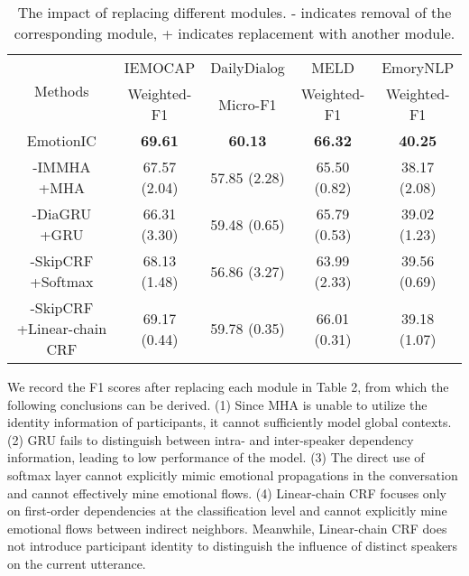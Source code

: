 \documentclass{SCIS2019}
\begin{document}
\begin{table}[htbp]
	\centering	
	\caption{The impact of replacing different modules. - indicates removal of the corresponding module, + indicates replacement with another module.}
	\label{tab:modules_}	
	\renewcommand{\arraystretch}{1.0}
	\setlength{\tabcolsep}{9pt}	
	\begin{tabular}{c|c|c|c|c}
	\toprule
\multirow{2}{*}{Methods} &\multicolumn{1}{c|}{IEMOCAP}& \multicolumn{1}{c|}{DailyDialog} & \multicolumn{1}{c|}{MELD} & \multicolumn{1}{c}{EmoryNLP}\\
	\cline{2-5}
	&Weighted-F1 & Micro-F1 &Weighted-F1 &Weighted-F1\\
	\hline
	EmotionIC & \textbf{69.61} &\textbf{60.13} & \textbf{66.32} &\textbf{40.25} \\
	\hline 
	-IMMHA +MHA & 67.57  (2.04)&57.85 (2.28)& 65.50 (0.82) &38.17  (2.08)\\
	-DiaGRU +GRU & 66.31  (3.30)&59.48 (0.65)& 65.79 (0.53) &39.02  (1.23)\\
	-SkipCRF +Softmax &68.13  (1.48)	&56.86 (3.27)&63.99 (2.33) &39.56 (0.69)\\
	-SkipCRF +Linear-chain CRF & 69.17  (0.44)&59.78 (0.35)& 66.01 (0.31) &39.18  (1.07)\\	
	\bottomrule
	\end{tabular}
\end{table}
We record the F1 scores after replacing each module in Table 2, from which the following conclusions can be derived.
(1) Since MHA is unable to utilize the identity information of participants, it cannot sufficiently model global contexts.
(2) GRU fails to distinguish between intra- and inter-speaker dependency information, leading to low performance of the model.
(3) The direct use of softmax layer cannot explicitly mimic emotional propagations in the conversation and cannot effectively mine emotional flows.
(4) Linear-chain CRF focuses only on first-order dependencies at the classification level and cannot explicitly mine emotional flows between indirect neighbors. Meanwhile, Linear-chain CRF does not introduce participant identity to distinguish the influence of distinct speakers on the current utterance.
\end{document}
